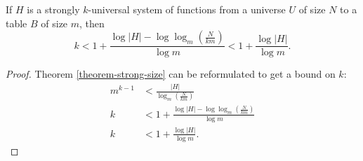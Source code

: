 \begin{corollary}
If $H$ is a strongly $k$-universal system of functions from a universe $U$ of size $N$ to a table $B$ of size $m$, then
\begin{displaymath}
k < 1 + \frac{\log |H| - \log \log_m \left( \frac{N}{km} \right)}{\log m} < 1 + \frac{\log |H|}{\log m} \text{.}
\end{displaymath}
\end{corollary}
\begin{proof}
Theorem \ref{theorem-strong-size} can be reformulated to get a bound on $k$:
\begin{displaymath}
\begin{split}
m^{k - 1} & < \frac{|H|}{\log_m \left( \frac{N}{km} \right)} \\
k & < 1 + \frac{\log |H| - \log \log_m \left( \frac{N}{km} \right)}{\log m} \\
k & < 1 + \frac{\log |H|}{\log m} \text{.}
\end{split}
\end{displaymath}
\end{proof}
